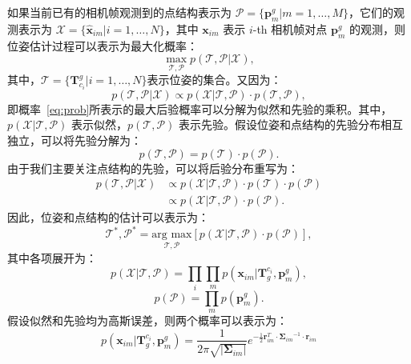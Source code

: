 如果当前已有的相机帧观测到的点结构表示为 $\mathcal{P} = \{\symbf{p}^g_m | m = 1, \dots, M\}$，它们的观测表示为 $\mathcal{X} = \{\hat{\symbf{x}}_{im}|i=1,\dots, N\}$，其中 $\symbf{x}_{im}$ 表示 $i$-th 相机帧对点 $\symbf{p}^g_m$ 的观测，则位姿估计过程可以表示为最大化概率：
\begin{equation}
\label{eq:prob}
  \max_{\mathcal{T}, \mathcal{P}} p(\mathcal{T}, \mathcal{P} | \mathcal{X}),
\end{equation}
其中，$\mathcal{T} = \{ \symbf{T}_{c_i}^g | i=1,\dots, N\}$表示位姿的集合。又因为：
\begin{equation}
p(\mathcal{T}, \mathcal{P} | \mathcal{X}) \propto p(\mathcal{X} | \mathcal{T}, \mathcal{P}) \cdot p(\mathcal{T}, \mathcal{P}),
\end{equation}
即概率~\ref{eq:prob}所表示的最大后验概率可以分解为似然和先验的乘积。其中，$p(\mathcal{X} | \mathcal{T}, \mathcal{P})$ 表示似然，$p(\mathcal{T}, \mathcal{P})$ 表示先验。假设位姿和点结构的先验分布相互独立，可以将先验分解为：
\begin{equation}
  p(\mathcal{T}, \mathcal{P}) = p(\mathcal{T}) \cdot p(\mathcal{P}).
\end{equation}
由于我们主要关注点结构的先验，可以将后验分布重写为：
\begin{equation}
\begin{aligned}
  p(\mathcal{T}, \mathcal{P} | \mathcal{X}) &\propto p(\mathcal{X} | \mathcal{T}, \mathcal{P}) \cdot p(\mathcal{T}) \cdot p(\mathcal{P}) \\
  &\propto p(\mathcal{X} | \mathcal{T}, \mathcal{P}) \cdot p(\mathcal{P}).
\end{aligned}
\end{equation}
因此，位姿和点结构的估计可以表示为：
\begin{equation}
  \label{eq:max_post}
  \mathcal{T}^*, \mathcal{P}^* = \underset{\mathcal{T}, \mathcal{P}}{\text{arg max}} \left[ p(\mathcal{X} | \mathcal{T}, \mathcal{P}) \cdot p(\mathcal{P}) \right],
\end{equation}
其中各项展开为：
\begin{equation}
p(\mathcal{X} | \mathcal{T}, \mathcal{P}) = \prod_i \prod_m p(\symbf{x}_{im} | \symbf{T}_g^{c_i}, \symbf{p}_m^g),
\end{equation}
\begin{equation}
p(\mathcal{P}) = \prod_m p(\symbf{p}_m^g).
\end{equation}
假设似然和先验均为高斯误差，则两个概率可以表示为：
\begin{equation}
  p(\symbf{x}_{im} | \symbf{T}_g^{c_i}, \symbf{p}_m^g) = \frac{1}{2\pi\sqrt{|\symbf{\Sigma}_{im}|}}e^{-\frac{1}{2}\symbf{r}_{im}^T \cdot {\symbf{\Sigma}_{im}}^{-1}\cdot \symbf{r}_{im}}
\end{equation}
